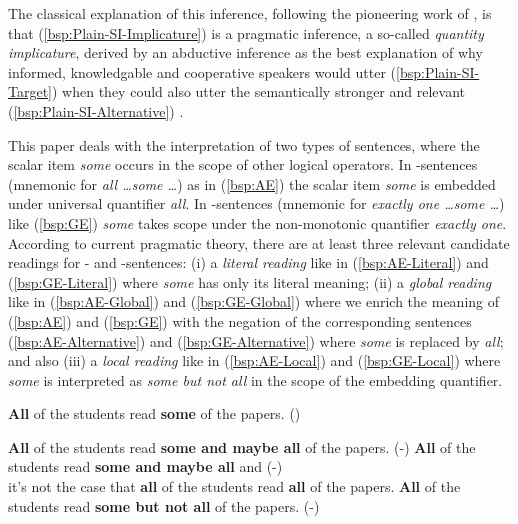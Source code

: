 \documentclass[fleqn,reqno,10pt,draft]{article}
\newcommand{\lit}{\acro{lit}}
\newcommand{\glb}{\acro{glb}}
\newcommand{\loc}{\acro{loc}}
\newcommand{\as}{\acro{as}}
\renewcommand{\es}{\acro{es}}
\renewcommand{\mymark}[1]{\textbf{#1}}
\begin{document}
\noindent The classical explanation of this inference, following the
pioneering work of \citet{Grice1975:Logic-and-Conve}, is that
(\ref{bsp:Plain-SI-Implicature}) is a pragmatic inference, a so-called
\emph{quantity implicature}, derived by an abductive inference as the
best explanation of why informed, knowledgable and cooperative
speakers would utter (\ref{bsp:Plain-SI-Target}) when they could also
utter the semantically stronger and relevant
(\ref{bsp:Plain-SI-Alternative}) \citep[see][for
recent overview]{Geurts2010:Quantity-Implic}.




This paper deals with the interpretation of two types of sentences,
where the scalar item \emph{some} occurs in the scope of other logical
operators. In \as-sentences (mnemonic for \textit{all \dots some
  \dots}) as in (\ref{bsp:AE}) the scalar item \emph{some} is embedded
under universal quantifier \emph{all}. In \es-sentences (mnemonic for
\textit{exactly one \dots some \dots}) like (\ref{bsp:GE}) \emph{some}
takes scope under the non-monotonic quantifier \emph{exactly one}.
According to current pragmatic theory, there are at least three
relevant candidate readings for \as- and \es-sentences: (i) a
\emph{literal reading} like in (\ref{bsp:AE-Literal}) and
(\ref{bsp:GE-Literal}) where \emph{some} has only its literal meaning;
(ii) a \emph{global reading} like in (\ref{bsp:AE-Global}) and
(\ref{bsp:GE-Global}) where we enrich the meaning of (\ref{bsp:AE})
and (\ref{bsp:GE}) with the negation of the corresponding sentences
(\ref{bsp:AE-Alternative}) and (\ref{bsp:GE-Alternative}) where
\emph{some} is replaced by \emph{all}; and also (iii) a \emph{local
  reading} like in (\ref{bsp:AE-Local}) and (\ref{bsp:GE-Local}) where
\emph{some} is interpreted as \emph{some but not all} in the scope of
the embedding quantifier.


\begin{exe}
  \ex \label{bsp:AE} \mymark{All} of the students read {\mymark{some}} of the
  papers. \hfill{(\as)}

  \begin{xlist}
  \ex \label{bsp:AE-Literal} \mymark{All} of the students read
    {\mymark{some and maybe all}} of the papers. \hfill (\as-\lit)
  \ex \label{bsp:AE-Global}
    \mymark{All} of the students read \mymark{some and maybe all} 
    and  \hfill (\as-\glb)\\
    it's not the case that \mymark{all} of the students read \mymark{all} of the papers.
  \ex \label{bsp:AE-Local}
    \mymark{All} of the students read {\mymark{some  but not all}} of the
    papers. \hfill (\as-\loc)
  \end{xlist}
\end{exe}
\end{document}

